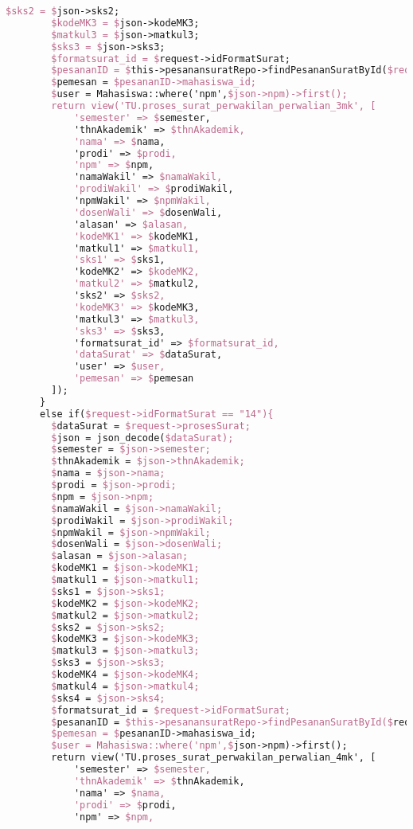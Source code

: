 \begin{lstlisting}[language=tex,basicstyle=\tiny,caption=PesanansuratController.php]
        $sks2 = $json->sks2;
        $kodeMK3 = $json->kodeMK3;
        $matkul3 = $json->matkul3;
        $sks3 = $json->sks3;
        $formatsurat_id = $request->idFormatSurat;
        $pesananID = $this->pesanansuratRepo->findPesananSuratById($request->id);
        $pemesan = $pesananID->mahasiswa_id;
        $user = Mahasiswa::where('npm',$json->npm)->first();
        return view('TU.proses_surat_perwakilan_perwalian_3mk', [
            'semester' => $semester,
            'thnAkademik' => $thnAkademik,
            'nama' => $nama,
            'prodi' => $prodi,
            'npm' => $npm,
            'namaWakil' => $namaWakil,
            'prodiWakil' => $prodiWakil,
            'npmWakil' => $npmWakil,
            'dosenWali' => $dosenWali,
            'alasan' => $alasan,
            'kodeMK1' => $kodeMK1,
            'matkul1' => $matkul1,
            'sks1' => $sks1,
            'kodeMK2' => $kodeMK2,
            'matkul2' => $matkul2,
            'sks2' => $sks2,
            'kodeMK3' => $kodeMK3,
            'matkul3' => $matkul3,
            'sks3' => $sks3,
            'formatsurat_id' => $formatsurat_id,
            'dataSurat' => $dataSurat,
            'user' => $user,
            'pemesan' => $pemesan
        ]);
      }
      else if($request->idFormatSurat == "14"){
        $dataSurat = $request->prosesSurat;
        $json = json_decode($dataSurat);
        $semester = $json->semester;
        $thnAkademik = $json->thnAkademik;
        $nama = $json->nama;
        $prodi = $json->prodi;
        $npm = $json->npm;
        $namaWakil = $json->namaWakil;
        $prodiWakil = $json->prodiWakil;
        $npmWakil = $json->npmWakil;
        $dosenWali = $json->dosenWali;
        $alasan = $json->alasan;
        $kodeMK1 = $json->kodeMK1;
        $matkul1 = $json->matkul1;
        $sks1 = $json->sks1;
        $kodeMK2 = $json->kodeMK2;
        $matkul2 = $json->matkul2;
        $sks2 = $json->sks2;
        $kodeMK3 = $json->kodeMK3;
        $matkul3 = $json->matkul3;
        $sks3 = $json->sks3;
        $kodeMK4 = $json->kodeMK4;
        $matkul4 = $json->matkul4;
        $sks4 = $json->sks4;
        $formatsurat_id = $request->idFormatSurat;
        $pesananID = $this->pesanansuratRepo->findPesananSuratById($request->id);
        $pemesan = $pesananID->mahasiswa_id;
        $user = Mahasiswa::where('npm',$json->npm)->first();
        return view('TU.proses_surat_perwakilan_perwalian_4mk', [
            'semester' => $semester,
            'thnAkademik' => $thnAkademik,
            'nama' => $nama,
            'prodi' => $prodi,
            'npm' => $npm,

\end{lstlisting}
